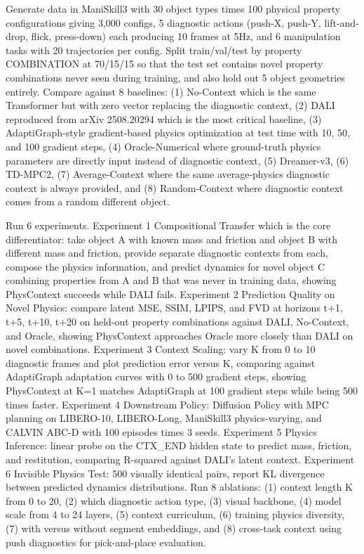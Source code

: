 \documentclass[11pt,a4paper]{article}
\begin{document}
Generate data in ManiSkill3 with 30 object types times 100 physical property configurations giving 3,000 configs, 5 diagnostic actions (push-X, push-Y, lift-and-drop, flick, press-down) each producing 10 frames at 5Hz, and 6 manipulation tasks with 20 trajectories per config. Split train/val/test by property COMBINATION at 70/15/15 so that the test set contains novel property combinations never seen during training, and also hold out 5 object geometries entirely. Compare against 8 baselines: (1) No-Context which is the same Transformer but with zero vector replacing the diagnostic context, (2) DALI reproduced from arXiv 2508.20294 which is the most critical baseline, (3) AdaptiGraph-style gradient-based physics optimization at test time with 10, 50, and 100 gradient steps, (4) Oracle-Numerical where ground-truth physics parameters are directly input instead of diagnostic context, (5) Dreamer-v3, (6) TD-MPC2, (7) Average-Context where the same average-physics diagnostic context is always provided, and (8) Random-Context where diagnostic context comes from a random different object.

Run 6 experiments. Experiment 1 Compositional Transfer which is the core differentiator: take object A with known mass and friction and object B with different mass and friction, provide separate diagnostic contexts from each, compose the physics information, and predict dynamics for novel object C combining properties from A and B that was never in training data, showing PhysContext succeeds while DALI fails. Experiment 2 Prediction Quality on Novel Physics: compare latent MSE, SSIM, LPIPS, and FVD at horizons t+1, t+5, t+10, t+20 on held-out property combinations against DALI, No-Context, and Oracle, showing PhysContext approaches Oracle more closely than DALI on novel combinations. Experiment 3 Context Scaling: vary K from 0 to 10 diagnostic frames and plot prediction error versus K, comparing against AdaptiGraph adaptation curves with 0 to 500 gradient steps, showing PhysContext at K=1 matches AdaptiGraph at 100 gradient steps while being 500 times faster. Experiment 4 Downstream Policy: Diffusion Policy with MPC planning on LIBERO-10, LIBERO-Long, ManiSkill3 physics-varying, and CALVIN ABC-D with 100 episodes times 3 seeds. Experiment 5 Physics Inference: linear probe on the CTX\_END hidden state to predict mass, friction, and restitution, comparing R-squared against DALI's latent context. Experiment 6 Invisible Physics Test: 500 visually identical pairs, report KL divergence between predicted dynamics distributions. Run 8 ablations: (1) context length K from 0 to 20, (2) which diagnostic action type, (3) visual backbone, (4) model scale from 4 to 24 layers, (5) context curriculum, (6) training physics diversity, (7) with versus without segment embeddings, and (8) cross-task context using push diagnostics for pick-and-place evaluation.
\end{document}
